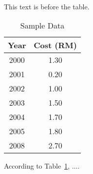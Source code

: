 \documentclass{article}
\begin{document}
This text is before the table.

\begin{table}[h]
	\begin{center}
		\begin{tabular}{|c|c|} \hline
			Year & Cost (RM)  \\
			\hline \hline
			2000 & 1.30 \\
			2001 & 0.20  \\
			2002 & 1.00  \\
			2003 & 1.50  \\
			2004 & 1.70  \\
			2005 & 1.80  \\
			2008 & 2.70  \\
			\hline
		\end{tabular}
	\end{center}
\caption {Sample Data}
\label{tab:TheCost}
\end{table}

According to Table~{\ref{tab:TheCost}}, $\dots$.
\end{document}
